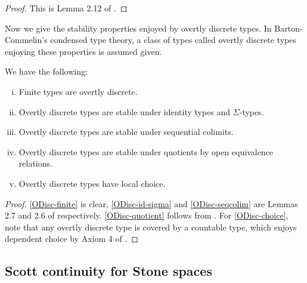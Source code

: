 \begin{proof}
This is Lemma 2.12 of \cite{synthetic-stone-duality}.
\end{proof}

Now we give the stability properties enjoyed by overtly discrete types. In Barton-Commelin's condensed type theory, a class of types called overtly discrete types enjoying these properties is assumed given.

\begin{proposition}\label{overtly-discrete-closure}
We have the following:

\begin{enumerate}[(i)]
  \item\label{ODisc-finite} Finite types are overtly discrete.
  \item\label{ODisc-id-sigma} Overtly discrete types are stable under identity types and $\Sigma$-types.
  \item\label{ODisc-seqcolim} Overtly discrete types are stable under sequential colimits.
  \item\label{ODisc-quotient} Overtly discrete types are stable under quotients by open equivalence relations.
  \item\label{ODisc-choice} Overtly discrete types have local choice.
\end{enumerate}
\end{proposition}

\begin{proof}
  \ref{ODisc-finite} is clear, \ref{ODisc-id-sigma} and \ref{ODisc-seqcolim} are Lemmas 2.7 and 2.6 of \cite{synthetic-stone-duality} respectively. \ref{ODisc-quotient} follows from . For \ref{ODisc-choice}, note that any overtly discrete type is covered by a countable type, which enjoys dependent choice by Axiom 4 of \cite{synthetic-stone-duality}.
\end{proof}




\subsection{Scott continuity for Stone spaces}
\label{scott-continuity-for-cohomology}

